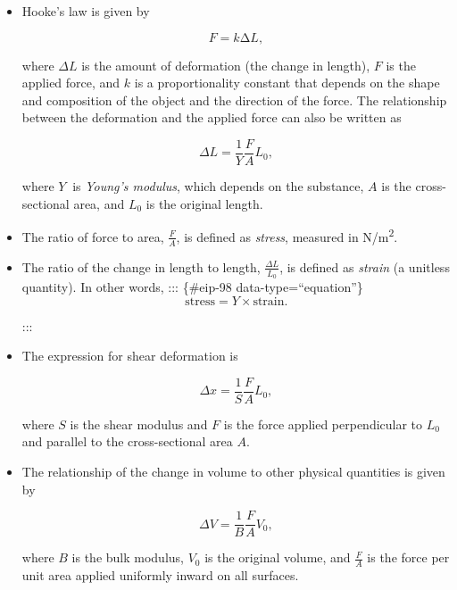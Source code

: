 \documentclass[
]{book}
\begin{document}
\begin{itemize}
\item
  \protect\hypertarget{import-auto-id1165298476009}{}{Hooke's law is given by}

  \leavevmode{}%
  \[{{F = k\text{Δ}L},}{}\]

  where \({\Delta L}{}\) is the amount of deformation (the change in
  length), \(F{}\) is the applied force, and \(k{}\) is a proportionality
  constant that depends on the shape and composition of the object and
  the direction of the force. The relationship between the deformation
  and the applied force can also be written as

  \leavevmode{}%
  \[{{{\Delta L = \frac{1}{Y}}\frac{F}{A}L_{0}},}{}\]

  where \emph{\(Y\ {}\)} is \emph{Young's modulus},
  which depends on the substance, \emph{\(A{}\)} is the cross-sectional area,
  and \(L_{0}{}\) is the original length.
\item
  \protect\hypertarget{import-auto-id1165298686194}{}{The ratio of force to area, \emph{\(\frac{F}{A}{}\)}, is defined as
  \emph{stress}, measured in N/m\textsuperscript{2}.}
\item
  \protect\hypertarget{import-auto-id1165298726978}{}{The ratio of the change in length to length,
  \(\frac{\Delta L}{L_{0}}{}\), is defined as \emph{strain} (a unitless
  quantity). In other words,}
  ::: \{\#eip-98 data-type=``equation''\}
  \[{\text{stress} = {Y \times \text{strain}}.}{}\]

  :::
\item
  \protect\hypertarget{import-auto-id1165298586473}{}{The expression for shear deformation
  is}

  \leavevmode{}%
  \[{{{\Delta x = \frac{1}{S}}\frac{F}{A}L_{0}},}{}\]

  where \(S\) is the shear modulus and \(F\) is the force applied
  perpendicular to \(L_{\text{0}}\) and parallel to the cross-sectional
  area \(A\).
\item
  \protect\hypertarget{import-auto-id1165298548492}{}{The relationship of the change in volume to other physical
  quantities is given by}

  \leavevmode{}%
  \[{{{\Delta V = \frac{1}{B}}\frac{F}{A}V_{0}},}{}\]

  where \(B\) is the bulk modulus, \(V_{\text{0}}\) is the original
  volume, and \(\frac{F}{A}{}\) is the force per unit area applied
  uniformly inward on all surfaces.
\end{itemize}
\end{document}
